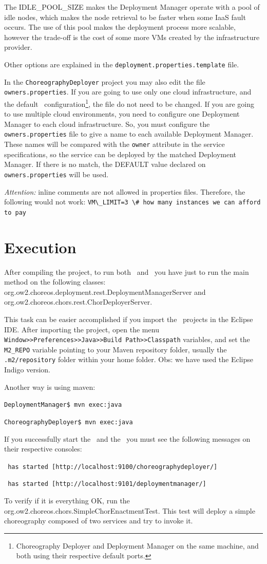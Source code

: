 The IDLE\_POOL\_SIZE makes the Deployment Manager operate with a pool of idle nodes, which makes the node retrieval to be faster when some IaaS fault occurs. The use of this pool makes the deployment process more scalable, however the trade-off is the cost of some more VMs created by the infrastructure provider. 

Other options are explained in the \texttt{deployment.properties.template} file.

In the \texttt{ChoreographyDeployer} project you may also edit the file \texttt{owners.properties}. If you are going to use only one cloud infrastructure, and the default \ee\ configuration\footnote{Choreography Deployer and Deployment Manager on the same machine, and both using their respective default ports.}, the file do not need to be changed. If you are going to use multiple cloud environments, you need to configure one Deployment Manager to each cloud infrastructure. So, you must configure the \texttt{owners.properties} file to give a name to each available Deployment Manager. These names will be compared with the \texttt{owner} attribute in the  service specifications, so the service can be deployed by the matched Deployment Manager. If there is no match, the DEFAULT value declared on \texttt{owners.properties} will be used.

\emph{Attention:} inline comments are not allowed in properties files. Therefore, the following would not work: \verb!VM\_LIMIT=3 \# how many instances we can afford to pay!

\section{Execution}

After compiling the project, to run both \cd\ and \dm\ you have just to run the main method on the following classes: \textsf{org.ow2.choreos.deployment.rest.DeploymentManagerServer} and \textsf{org.ow2.choreos.chors.rest.ChorDeployerServer}.

This task can be easier accomplished if you import the \ee\ projects in the Eclipse IDE. After importing the project, open the menu \texttt{Window>>Preferences>>Java>>Build Path>>Classpath} variables, and set the \texttt{M2\_REPO} variable pointing to your Maven repository folder, usually the \texttt{.m2/repository} folder within your home folder. Obs: we have used the Eclipse Indigo version.

Another way is using maven:

\texttt{DeploymentManager\$ mvn exec:java}

\texttt{ChoreographyDeployer\$ mvn exec:java}

If you successfully start the \cd\ and the \dm\, you must see the following messages on their respective consoles: 

\texttt{\cd\ has started [http://localhost:9100/choreographydeployer/]}

\texttt{\dm\ has started [http://localhost:9101/deploymentmanager/]}

To verify if it is everything OK, run the \textsf{org.ow2.choreos.chors.SimpleChorEnactmentTest}. This test will deploy a simple choreography composed of two services and try to invoke it.

